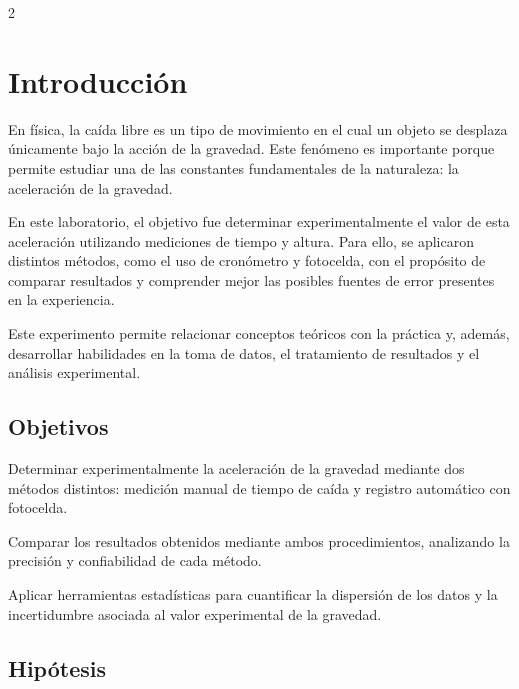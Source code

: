 \documentclass[11pt,letterpaper]{article}
\begin{document}
\vspace{0.4cm}

\begin{multicols}{2}
\raggedcolumns  %

\section{Introducción}

En física, la caída libre es un tipo de movimiento en el cual un objeto se desplaza únicamente bajo la acción de la gravedad. Este fenómeno es importante porque permite estudiar una de las constantes fundamentales de la naturaleza: la aceleración de la gravedad.

En este laboratorio, el objetivo fue determinar experimentalmente el valor de esta aceleración utilizando mediciones de tiempo y altura. Para ello, se aplicaron distintos métodos, como el uso de cronómetro y fotocelda, con el propósito de comparar resultados y comprender mejor las posibles fuentes de error presentes en la experiencia.

Este experimento permite relacionar conceptos teóricos con la práctica y, además, desarrollar habilidades en la toma de datos, el tratamiento de resultados y el análisis experimental.

\subsection{Objetivos}

Determinar experimentalmente la aceleración de la gravedad mediante dos métodos distintos: medición manual de tiempo de caída y registro automático con fotocelda.

Comparar los resultados obtenidos mediante ambos procedimientos, analizando la precisión y confiabilidad de cada método.

Aplicar herramientas estadísticas para cuantificar la dispersión de los datos y la incertidumbre asociada al valor experimental de la gravedad.

\subsection{Hipótesis}


\end{multicols}
\end{document}
